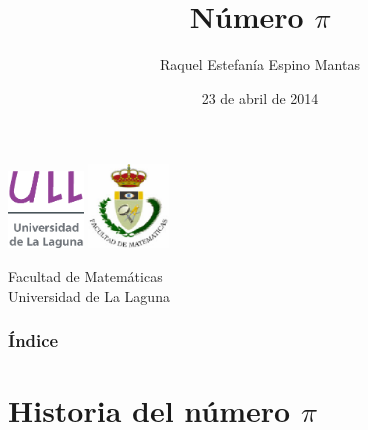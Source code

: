 \documentclass{beamer}
\title[Presentación con Beamer del nímero $\pi$]{Número $\pi$ }
\author[Técnicas Experimentales]{Raquel Estefanía Espino Mantas}
\date[23-04-2014]{23 de abril de 2014}
\begin{document}
  
\begin{frame}

  \includegraphics[width=0.15\textwidth]{img/ullesc}
  \hspace*{7.0cm}
  \includegraphics[width=0.16\textwidth]{img/fmatesc}
  \titlepage

  \begin{small}
    \begin{center}
     Facultad de Matemáticas \\
     Universidad de La Laguna
    \end{center}
  \end{small}

\end{frame}

\begin{frame}
  \frametitle{Índice}
  \tableofcontents[pausesections]
\end{frame}


\section{Historia del número $\pi$}
\end{document}
